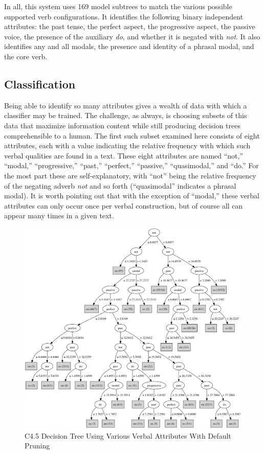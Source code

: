 \documentclass[main.tex]{subfiles}
\begin{document}
In all, this system uses 169 model subtrees to match the various possible supported verb configurations. It identifies the following binary independent attributes: the past tense, the perfect aspect, the progressive aspect, the passive voice, the presence of the auxiliary \textit{do}, and whether it is negated with \textit{not}. It also identifies any and all modals, the presence and identity of a phrasal modal, and the core verb.

\subsection{Classification}
Being able to identify so many attributes gives a wealth of data with which a classifier may be trained. The challenge, as always, is choosing subsets of this data that maximize information content while still producing decision trees comprehensible to a human. The first such subset examined here consists of eight attributes, each with a value indicating the relative frequency with which such verbal qualities are found in a text. These eight attributes are named ``not,'' ``modal,'' ``progressive,'' ``past,'' ``perfect,'' ``passive,'' ``quasimodal,'' and ``do.'' For the most part these are self-explanatory, with ``not'' being the relative frequency of the negating adverb \textit{not} and so forth (``quasimodal'' indicates a phrasal modal). It is worth pointing out that with the exception of ``modal,'' these verbal attributes can only occur once per verbal construction, but of course all can appear many times in a given text. 

\begin{figure}[htbp]
\centering
\includegraphics[width=6in]{unpruned-basic-verb-tree.pdf}
\caption{C4.5 Decision Tree Using Various Verbal Attributes With Default Pruning}
\label{fig:normally-pruned-basic-verb-tree}
\end{figure}
\end{document}
